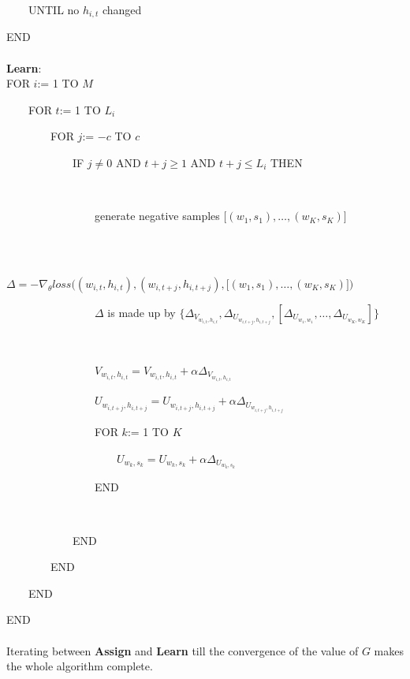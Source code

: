 \documentclass[12pt,a4paper,twoside]{book}
\begin{document}
\ \ \ \ UNTIL no $h_{i,t}$ changed

END
\paragraph{} \textbf{Learn}:\\

FOR $i$:= 1 TO $M$

\ \ \ \ FOR $t$:= 1 TO $L_i$

\ \ \ \ \ \ \ \ FOR $j$:= $-c$ TO $c$

\ \ \ \ \ \ \ \ \ \ \ \ IF $j\neq 0$ AND $t+j\geq1$ AND $t+j\leq L_i$ THEN

\ \ \ \ \ \ \ \ \ \ \ \ \ \ \ \

\ \ \ \ \ \ \ \ \ \ \ \ \ \ \ \ generate negative samples $\big [(w_1,s_1),\ldots,(w_K,s_K)\big ]$

\ \ \ \ \ \ \ \ \ \ \ \ \ \ \ \

\ \ \ \ \ \ \ \ \ \ \ \ \ \ \ \ $\Delta = -\nabla_\theta loss\bigg ( (w_{i,t},h_{i,t}),(w_{i,t+j},h_{i,t+j}),\big [(w_1,s_1),\ldots,(w_K,s_K)\big ]\bigg )$

\ \ \ \ \ \ \ \ \ \ \ \ \ \ \ \ $\Delta$ is made up by $ \{\Delta_{V_{w_{i,t},h_{i,t}}}, \Delta_{U_{w_{i,t+j},h_{i,t+j}}}, [\Delta_{U_{w_1,w_1}},\ldots,\Delta_{U_{w_K,w_K}}]\}$

\ \ \ \ \ \ \ \ \ \ \ \ \ \ \ \

\ \ \ \ \ \ \ \ \ \ \ \ \ \ \ \ $V_{w_{i,t},h_{i,t}} = V_{w_{i,t},h_{i,t}} + \alpha \Delta_{V_{w_{i,t},h_{i,t}}}$
 
\ \ \ \ \ \ \ \ \ \ \ \ \ \ \ \ $U_{w_{i,t+j},h_{i,t+j}} = U_{w_{i,t+j},h_{i,t+j}} + \alpha \Delta_{U_{w_{i,t+j},h_{i,t+j}}}$ 

\ \ \ \ \ \ \ \ \ \ \ \ \ \ \ \ FOR $k$:= 1 TO $K$

\ \ \ \ \ \ \ \ \ \ \ \ \ \ \ \ \ \ \ \ $U_{w_k,s_k} = U_{w_k,s_k} + \alpha \Delta_{U_{w_k,s_k}}$ 

\ \ \ \ \ \ \ \ \ \ \ \ \ \ \ \ END

\ \ \ \ \ \ \ \ \ \ \ \ \ \ \ \
 
\ \ \ \ \ \ \ \ \ \ \ \ END 

\ \ \ \ \ \ \ \  END

\ \ \ \ END

END

\paragraph{}
Iterating between \textbf{Assign} and \textbf{Learn} till the convergence of the value of $G$ makes the whole algorithm complete. 
\end{document}
